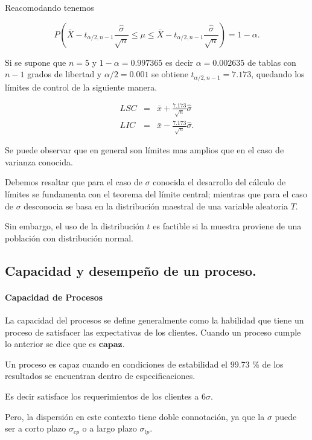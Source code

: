 \documentclass[spanish]{report}
\begin{document}
Reacomodando tenemos

\begin{equation}
P(\bar{X}-t_{\alpha/2,n-1} \frac{\hat{\sigma}}{\sqrt{n}} \leq \mu \leq \bar{X}-t_{\alpha/2,n-1} \frac{\hat{\sigma}}{\sqrt{n}}) = 1-\alpha.
\label{c2eq9}
\end{equation}


Si se supone que $n = 5$ y $1-\alpha = 0.997365$ es decir $\alpha = 0.002635$ de tablas con $n-1$ grados de libertad y $\alpha/2 = 0.001$ se obtiene $t_{\alpha/2,n-1} = 7.173$, quedando los límites de control de la siguiente manera.

\begin{eqnarray*}
LSC & = & \bar{x}+\frac{7.173}{\sqrt{n}}\hat{\sigma}\\
LIC & = & \bar{x}-\frac{7.173}{\sqrt{n}}\hat{\sigma}.
\end{eqnarray*}

Se puede observar que en general son límites mas amplios que en el caso de varianza conocida. 

Debemos resaltar que para el caso de $\sigma$ conocida el desarrollo del cálculo de límites se fundamenta con el teorema del límite central; mientras que para el caso de $\sigma$ desconocia se basa en la distribución maestral de una variable aleatoria $T$. 

Sin embargo, el uso de la distribución $t$ es factible si la muestra proviene de una población con distribución normal. 

\subsection{Capacidad y desempeño de un proceso. }


\paragraph{Capacidad de Procesos}

La capacidad del procesos se define generalmente como la
habilidad que tiene un proceso de satisfacer las expectativas de los
clientes. Cuando un proceso cumple lo anterior se dice que es $\textbf{capaz}$.

Un proceso es capaz cuando en condiciones de estabilidad el 99.73
\% de los resultados se encuentran dentro de especificaciones.

Es decir satisface los requerimientos de los clientes a $6\sigma$.

Pero, la dispersión en este contexto tiene doble connotación, ya que la $\sigma$ puede ser
a corto plazo $\sigma_{cp}$ o a largo plazo $\sigma_{lp}$.
\end{document}
